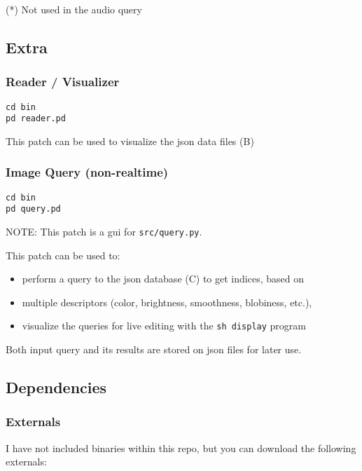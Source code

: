 (*) Not used in the audio query


\subsection{Extra}


\subsubsection{Reader / Visualizer}

\begin{verbatim}
cd bin
pd reader.pd
\end{verbatim}

This patch can be used to visualize the \gls{json} data files (B)




\subsubsection{Image Query (non-realtime)}

\begin{verbatim}
cd bin
pd query.pd
\end{verbatim}

NOTE: This patch is a gui for \texttt{src/query.py}.

This patch can be used to:

\begin{itemize}
\tightlist
\item
  perform a query to the \gls{json} database (C) to get indices, based on
\item
  multiple descriptors (color, brightness, smoothness, blobiness, etc.),
\item
  visualize the queries for live editing with the \texttt{sh\ display} program
\end{itemize}

Both input query and its results are stored on \gls{json} files for later use.




\subsection{Dependencies}


\subsubsection{Externals}

I have not included binaries within this repo, but you can download the following externals:

